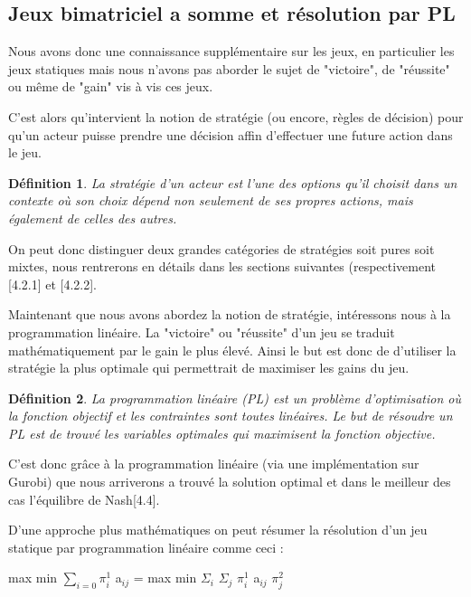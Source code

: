 \documentclass[a4paper, 12pt, twoside]{article}
\newtheorem{definition}{Définition}
\begin{document}
\subsection{Jeux bimatriciel a somme et résolution par PL}
Nous avons donc une connaissance supplémentaire sur les jeux, en particulier les \textsf{jeux statiques} mais nous n'avons pas aborder le sujet de "victoire", de "réussite" ou même de "gain" vis à vis ces jeux. \newline

C'est alors qu'intervient la notion de \textsf{stratégie} (ou encore, règles de décision) pour  qu'un acteur puisse prendre une décision affin d'effectuer une future action dans le jeu.\newline
\begin{definition}
La stratégie d’un acteur est l’une des options qu’il choisit dans un contexte où son choix dépend non seulement de ses propres actions, mais également de celles des autres.
\end{definition}

On peut donc distinguer deux grandes catégories de \textsf{stratégies} soit pures soit mixtes, nous rentrerons en détails dans les sections suivantes (respectivement [4.2.1] et [4.2.2]. \newline

Maintenant que nous avons abordez la notion de stratégie, intéressons nous à la programmation linéaire. La "victoire" ou "réussite" d'un jeu se traduit mathématiquement par le \textsf{gain} le plus élevé. Ainsi le but est donc de d'utiliser la stratégie la plus optimale qui permettrait de maximiser les \textsf{gains} du jeu.

\begin{definition}
La programmation linéaire (PL) est un problème d'optimisation où la fonction objectif et les contraintes sont toutes linéaires. Le but de résoudre un PL est de trouvé les variables optimales qui maximisent la fonction objective.
\end{definition}

C'est donc grâce à la \textsf{programmation linéaire} (via une implémentation sur \textsf{Gurobi}) que nous arriverons a trouvé la solution optimal et dans le meilleur des cas \textsf{l'équilibre de Nash}[4.4]. \newline

D'une approche plus mathématiques on peut résumer la résolution d'un \textsf{jeu statique} par \textsf{programmation linéaire} comme ceci : \newline
\begin{center}
max  min $ \sum_{i=0} \pi_{i}^{1}$ a$ _{ij} $ = max min $ \Sigma _{i} $ $ \Sigma _{j} $ $\pi_{i}^{1}$ a$ _{ij} $ $ \pi_{j}^{2} $
\end{center}
\end{document}
